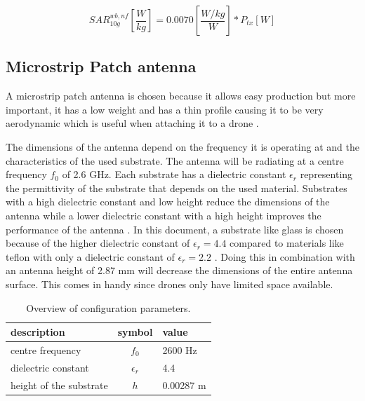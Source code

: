 \documentclass[twocolumn]{phdsymp} %
\begin{document}
\begin{equation} 
SAR^{wb,nf}_{10g} \left[\frac{W}{kg}\right] = 0.0070 \left[\frac{W/kg}{W}\right] * P_{tx} [W]
\label{eq:ulToSar}
\end{equation}

\subsection{Microstrip Patch antenna}
A microstrip patch antenna is chosen because it allows easy production but more important, it has a low weight 
and has a thin profile causing it to be very aerodynamic which is useful when attaching it to a drone \cite{J13_microstripadvantages}.

The dimensions of the antenna depend on the frequency it is operating at and the characteristics of the used substrate.
The antenna will be radiating at a centre frequency $f_0$ of 2.6 GHz. Each substrate has a dielectric constant $\epsilon_r$ representing 
the permittivity of the substrate that depends on the used material.
Substrates with a high dielectric constant and low height 
reduce the dimensions of the antenna
while a lower dielectric constant with a high height improves the performance of the antenna \cite{J14_antennadesign,J15_antennadesign}. 
In this document, a substrate like glass 
is chosen because of the higher dielectric constant of $\epsilon_r = 4.4$ compared to materials like teflon with only a dielectric 
constant of $\epsilon_r = 2.2$ \cite{J14_antennadesign}. 
Doing this in combination with an antenna height of 2.87 mm will decrease the dimensions of the entire antenna surface.
This comes in handy since drones only have limited space available.

\begin{table}[h!]
\centering
\begin{tabular}{|l|c|l|}
\hline
 description            & symbol          & value         \\    \hline
 centre frequency       & $f_0$           & 2600 Hz       \\ 
 dielectric constant    & $\epsilon_r$    & 4.4         \\ 
 height of the substrate & $h$             & 0.00287 m    \\ \hline
\end{tabular}
\caption{Overview of configuration parameters.}
\label{table:antennaparas}
\end{table}
\end{document}
